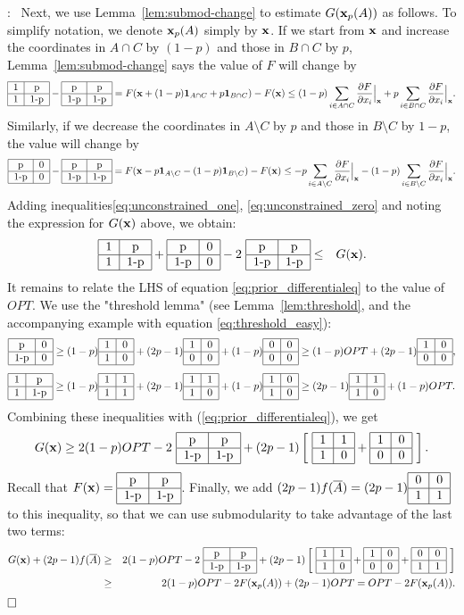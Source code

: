 \documentclass{article}[11pt]
\newcommand{\partdiff}[2]{\frac{\partial {#1}}{\partial {#2}}}
\renewenvironment{proof}{\noindent{\bf Proof}:~}{$\hfill \Box$\\}
\newcommand{\T}[4] {\begin{tabular}{|c|c|}
\hline
#1 & #2 \\
\hline
#3 & #4 \\
\hline
\end{tabular}}
\def\b1{{\bf 1}}
\def\bx{{\bf x}}
\begin{document}
\begin{proof}
Next, we use Lemma~\ref{lem:submod-change} to estimate $G(\bx_p(A))$ as follows.
To simplify notation, we denote $\bx_p(A)$ simply by $\bx$. 
If we start from $\bx$ and increase the coordinates in $A \cap C$ by $(1-p)$
and those in $B \cap C$ by $p$, Lemma~\ref{lem:submod-change} says
the value of $F$ will change by 
\begin{equation}
\label{eq:unconstrained_one}
\T{1}{p}{1}{1-p} - \T{p}{p}{1-p}{1-p}
 = F(\bx + (1-p) \b1_{A \cap C} + p \b1_{B \cap C}) - F(\bx) \leq
(1-p) \sum_{i \in A \cap C} \partdiff{F}{x_i} \Big|_\bx 
+ p \sum_{i \in B \cap C} \partdiff{F}{x_i} \Big|_\bx.
\end{equation}
Similarly, if we decrease the coordinates in $A \setminus C$ by $p$ and
those in $B \setminus C$ by $1-p$, the value will change by
\begin{equation}
\label{eq:unconstrained_zero}
 \T{p}{0}{1-p}{0} - \T{p}{p}{1-p}{1-p} 
 = F(\bx - p \b1_{A \setminus C} - (1-p) \b1_{B \setminus C}) - F(\bx)
\leq - p \sum_{i\in A\setminus{C}} \partdiff{F}{x_i} \Big|_\bx
 - (1-p) \sum_{i\in B\setminus{C}} \partdiff{F}{x_i} \Big|_\bx.
\end{equation}
Adding inequalities\eqref{eq:unconstrained_one}, \eqref{eq:unconstrained_zero}
and noting the expression for $G(\bx)$ above, we obtain:
\begin{eqnarray}
\label{eq:prior_differentialeq}
\T{1}{p}{1}{1-p} + \T{p}{0}{1-p}{0} - 2~ \T{p}{p}{1-p}{1-p} & \leq &
G(\bx).
\end{eqnarray}
It remains to  relate the LHS of equation \eqref{eq:prior_differentialeq} to the value of $OPT$. We use the "threshold lemma" (see Lemma~\ref{lem:threshold}, and the accompanying example with equation \eqref{eq:threshold_easy}):
$$ \T{p}{0}{1-p}{0} \geq (1-p) \T{1}{0}{1}{0} + (2p-1) \T{1}{0}{0}{0} + (1-p) \T{0}{0}{0}{0}
 \geq (1-p) OPT + (2p-1) \T{1}{0}{0}{0},$$
$$ \T{1}{p}{1}{1-p} \geq (1-p) \T{1}{1}{1}{1} + (2p-1) \T{1}{1}{1}{0} + (1-p) \T{1}{0}{1}{0}
 \geq (2p-1) \T{1}{1}{1}{0} + (1-p) OPT.$$
Combining these inequalities with (\ref{eq:prior_differentialeq}), we get
$$ G(\bx) \geq 2(1-p) OPT  - 2 ~\T{p}{p}{1-p}{1-p} + (2p-1) \left[~\T{1}{1}{1}{0} + \T{1}{0}{0}{0} ~\right].$$
Recall that $F(\bx) = \T{p}{p}{1-p}{1-p}$. Finally, we add $(2p-1) f(\overline{A})=(2p-1)\T{0}{0}{1}{1}$ to this inequality,
so that we can use submodularity to take advantage
of the last two terms: \begin{eqnarray*} G(\bx) + (2p-1) f(\overline{A}) & \geq &
 2(1-p) OPT  - 2 ~\T{p}{p}{1-p}{1-p} + (2p-1) \left[~\T{1}{1}{1}{0} + \T{1}{0}{0}{0} + \T{0}{0}{1}{1} ~\right]\\
 &\geq& 2(1-p) OPT - 2F(\bx_p(A))+ (2p-1)OPT 
  =  OPT - 2 F(\bx_p(A)).
\end{eqnarray*}
\end{proof}
\end{document}

